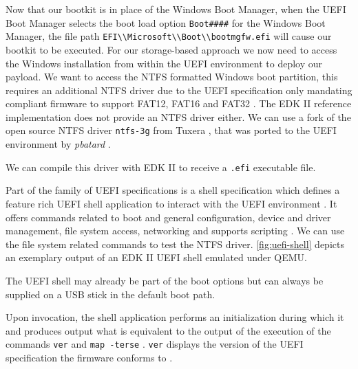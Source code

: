 Now that our bootkit is in place of the Windows Boot Manager, when the \ac{UEFI} Boot Manager selects the boot load option \lstinline{Boot####} for the Windows Boot Manager, the file path \lstinline{EFI\\Microsoft\\Boot\\bootmgfw.efi} will cause our bootkit to be executed.
For our storage-based approach we now need to access the Windows installation from within the \ac{UEFI} environment to deploy our payload. We want to access the \ac{NTFS} formatted Windows boot partition, this requires an additional \ac{NTFS} driver due to the \ac{UEFI} specification only mandating compliant firmware to support FAT12, FAT16 and FAT32 \cite[13.3.1.1]{uefi-spec}. The \ac{EDK} II reference implementation does not provide an \ac{NTFS} driver either.
We can use a fork of the open source \ac{NTFS} driver \lstinline{ntfs-3g} from Tuxera \cite{ntfs-3g}, that was ported to the \ac{UEFI} environment by \emph{pbatard} \cite{ntfs-3g-uefi}.

We can compile this driver with \ac{EDK} II to receive a \lstinline{.efi} executable file.

Part of the family of \ac{UEFI} specifications is a shell specification which defines a feature rich \ac{UEFI} shell application to interact with the \ac{UEFI} environment \cite[1.1]{uefi-shell-spec}. It offers commands related to boot and general configuration, device and driver management, file system access, networking \cite[5.1]{uefi-shell-spec} and supports scripting \cite[4]{uefi-shell-spec}. We can use the file system related commands to test the \ac{NTFS} driver.
\autoref{fig:uefi-shell} depicts an exemplary output of an EDK II UEFI shell emulated under QEMU.

The \ac{UEFI} shell may already be part of the boot options but can always be supplied on a \ac{USB} stick in the default boot path.

Upon invocation, the shell application performs an initialization during which it  and produces output what is equivalent to the output of the execution of the commands \lstinline{ver} and \lstinline{map -terse} \cite[3.3 Initialization]{uefi-shell-spec}. \lstinline{ver} displays the version of the \ac{UEFI} specification the firmware conforms to \cite[5.3 Shell Commands]{uefi-shell-spec}.

